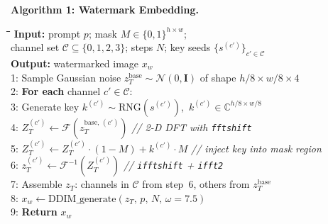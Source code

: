 \documentclass[10pt,twocolumn]{article}
\begin{document}
\medskip\noindent\textbf{Algorithm 1: Watermark Embedding.}
\begin{small}
\begin{tabbing}
\quad\=\quad\=\quad\=\quad\=\kill
\textbf{Input:} prompt $p$; mask $M \in \{0,1\}^{h \times w}$; \\
\> channel set $\mathcal{C} \subseteq \{0,1,2,3\}$; steps $N$; key seeds $\{s^{(c')}\}_{c'\in\mathcal{C}}$\\
\textbf{Output:} watermarked image $x_w$\\[4pt]
1:\> Sample Gaussian noise $z_T^{\mathrm{base}} \sim \mathcal{N}(0, \mathbf{I})$
        of shape $h/8 \times w/8 \times 4$\\
2:\> \textbf{For each} channel $c' \in \mathcal{C}$:\\
3:\>\> Generate key $k^{(c')} \sim \mathrm{RNG}(s^{(c')})$,\,
        $k^{(c')} \in \mathbb{C}^{h/8 \times w/8}$\\
4:\>\> $Z_T^{(c')} \leftarrow \mathcal{F}(z_T^{\mathrm{base},\,(c')})$
        \hfill\textit{// 2-D DFT with \texttt{fftshift}}\\
5:\>\> $Z_T^{(c')} \leftarrow Z_T^{(c')} \cdot (1 - M) + k^{(c')} \cdot M$
        \hfill\textit{// inject key into mask region}\\
6:\>\> $z_T^{(c')} \leftarrow \mathcal{F}^{-1}(Z_T^{(c')})$
        \hfill\textit{// \texttt{ifftshift} + \texttt{ifft2}}\\
7:\> Assemble $z_T$: channels in $\mathcal{C}$ from step~6, others from $z_T^{\mathrm{base}}$\\
8:\> $x_w \leftarrow \mathrm{DDIM\_generate}(z_T,\, p,\, N,\, \omega{=}7.5)$\\
9:\> \textbf{Return} $x_w$
\end{tabbing}
\end{small}
\end{document}
